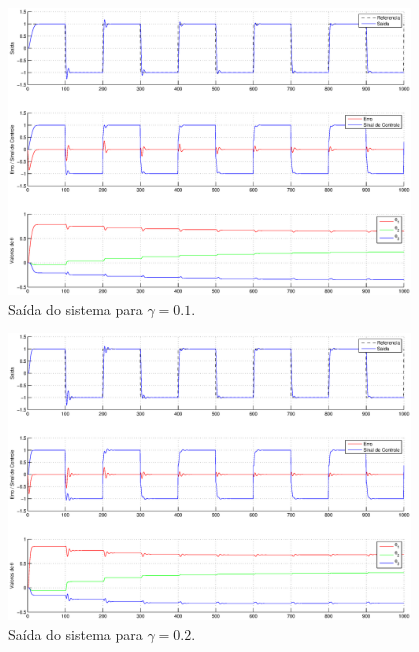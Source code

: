 \begin{figure}[htb]
    \centering
    \includegraphics[width=0.95\textwidth]{imgs/questao3/saida_gamma_0.1.eps}
    \caption{Saída do sistema para $\gamma = 0.1$.}
    \label{fig:q3_saida_gamma_0.1}
\end{figure}

\begin{figure}[htb]
    \centering
    \includegraphics[width=0.95\textwidth]{imgs/questao3/saida_gamma_0.2.eps}
    \caption{Saída do sistema para $\gamma = 0.2$.}
    \label{fig:q3_saida_gamma_0.2}
\end{figure}

